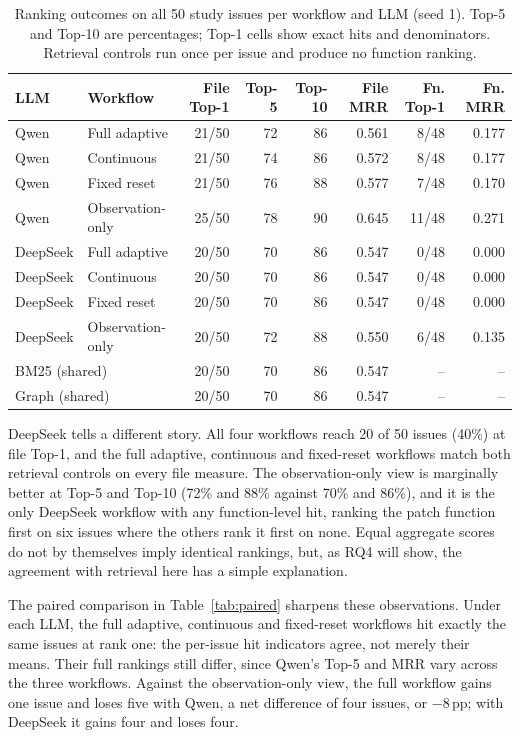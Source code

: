 \documentclass[a4paper,fleqn]{cas-sc}
\begin{document}
\begin{table}[pos=!htbp]
\caption{Ranking outcomes on all 50 study issues per workflow and LLM (seed 1). Top-5 and Top-10 are percentages; Top-1 cells show exact hits and denominators. Retrieval controls run once per issue and produce no function ranking.}\label{tab:eval-ranking}
\centering\small
\begin{tabular*}{\textwidth}{@{\extracolsep{\fill}}llrrrrrr@{}}\toprule
LLM & Workflow & File Top-1 & Top-5 & Top-10 & File MRR & Fn. Top-1 & Fn. MRR\\\midrule
Qwen & Full adaptive & 21/50 & 72 & 86 & 0.561 & 8/48 & 0.177\\
Qwen & Continuous & 21/50 & 74 & 86 & 0.572 & 8/48 & 0.177\\
Qwen & Fixed reset & 21/50 & 76 & 88 & 0.577 & 7/48 & 0.170\\
Qwen & Observation-only & 25/50 & 78 & 90 & 0.645 & 11/48 & 0.271\\
\midrule
DeepSeek & Full adaptive & 20/50 & 70 & 86 & 0.547 & 0/48 & 0.000\\
DeepSeek & Continuous & 20/50 & 70 & 86 & 0.547 & 0/48 & 0.000\\
DeepSeek & Fixed reset & 20/50 & 70 & 86 & 0.547 & 0/48 & 0.000\\
DeepSeek & Observation-only & 20/50 & 72 & 88 & 0.550 & 6/48 & 0.135\\
\midrule
\multicolumn{2}{l}{BM25 (shared)} & 20/50 & 70 & 86 & 0.547 & -- & --\\
\multicolumn{2}{l}{Graph (shared)} & 20/50 & 70 & 86 & 0.547 & -- & --\\
\bottomrule\end{tabular*}
\end{table}

DeepSeek tells a different story. All four workflows reach 20 of 50 issues (40\%) at file Top-1, and the full adaptive, continuous and fixed-reset workflows match both retrieval controls on every file measure. The observation-only view is marginally better at Top-5 and Top-10 (72\% and 88\% against 70\% and 86\%), and it is the only DeepSeek workflow with any function-level hit, ranking the patch function first on six issues where the others rank it first on none. Equal aggregate scores do not by themselves imply identical rankings, but, as RQ4 will show, the agreement with retrieval here has a simple explanation.

The paired comparison in Table~\ref{tab:paired} sharpens these observations. Under each LLM, the full adaptive, continuous and fixed-reset workflows hit exactly the same issues at rank one: the per-issue hit indicators agree, not merely their means. Their full rankings still differ, since Qwen's Top-5 and MRR vary across the three workflows. Against the observation-only view, the full workflow gains one issue and loses five with Qwen, a net difference of four issues, or $-8$\,pp; with DeepSeek it gains four and loses four.
\end{document}
